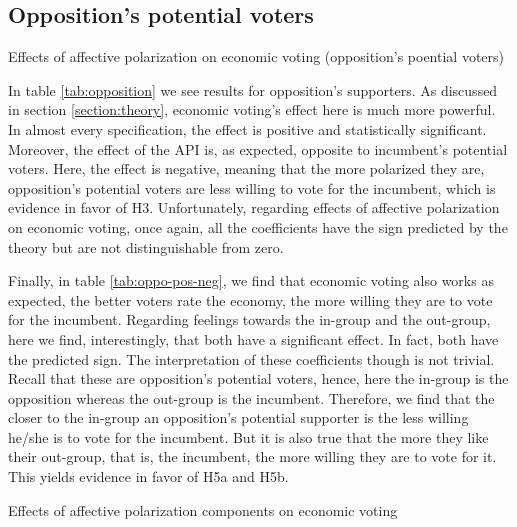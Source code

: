 \documentclass[a4paper, svgnames]{article}
\begin{document}
\subsection{Opposition's potential voters}

\begin{table}[H]
	\centering
	\caption{\label{tab:opposition} Effects of affective polarization on economic voting (opposition's poential voters)}
	

\end{table}

In table \ref{tab:opposition} we see results for opposition's supporters. As discussed in section \ref{section:theory}, economic voting's effect here is much more powerful. In almost every specification, the effect is positive and statistically significant. Moreover, the effect of the API is, as expected, opposite to incumbent's potential voters. Here, the effect is negative, meaning that the more polarized they are, opposition's potential voters are less willing to vote for the incumbent, which is evidence in favor of H3. Unfortunately, regarding effects of affective polarization on economic voting, once again, all the coefficients have the sign predicted by the theory but are not distinguishable from zero.

Finally, in table \ref{tab:oppo-pos-neg}, we find that economic voting also works as expected, the better voters rate the economy, the more willing they are to vote for the incumbent. Regarding feelings towards the in-group and the out-group, here we find, interestingly, that both have a significant effect. In fact, both have the predicted sign. The interpretation of these coefficients though is not trivial. Recall that these are opposition's potential voters, hence, here the in-group is the opposition whereas the out-group is the incumbent. Therefore, we find that the closer to the in-group an opposition's potential supporter  is the less willing he/she is to vote for the incumbent. But it is also true that the more they like their out-group, that is, the incumbent, the more willing they are to vote for it. This yields evidence in favor of H5a and H5b.

\begin{table}[H]
	\centering
	\caption{\label{tab:opposition-pos-neg} Effects of affective polarization components on economic voting}
	\label{tab:oppo-pos-neg}
	

\end{table}
\end{document}
